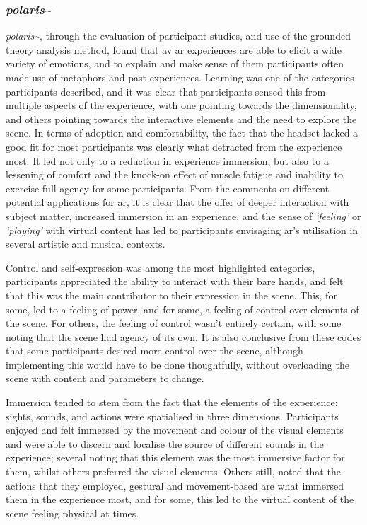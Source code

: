 \subsubsection{\textit{polaris\textasciitilde{}}}
\textit{polaris\textasciitilde{}}, through the evaluation of participant studies, and use of the grounded theory analysis method, found that \gls{av} \gls{ar} experiences are able to elicit a wide variety of emotions, and to explain and make sense of them participants often made use of metaphors and past experiences. Learning was one of the categories participants described, and it was clear that participants sensed this from multiple aspects of the experience, with one pointing towards the dimensionality, and others pointing towards the interactive elements and the need to explore the scene. In terms of adoption and comfortability, the fact that the headset lacked a good fit for most participants was clearly what detracted from the experience most. It led not only to a reduction in experience immersion, but also to a lessening of comfort and the knock-on effect of muscle fatigue and inability to exercise full agency for some participants. From the comments on different potential applications for \gls{ar}, it is clear that the offer of deeper interaction with subject matter, increased immersion in an experience, and the sense of \textit{`feeling'} or \textit{`playing'} with virtual content has led to participants envisaging \gls{ar}'s utilisation in several artistic and musical contexts. 

Control and self-expression was among the most highlighted categories, participants appreciated the ability to interact with their bare hands, and felt that this was the main contributor to their expression in the scene. This, for some, led to a feeling of power, and for some, a feeling of control over elements of the scene. For others, the feeling of control wasn't entirely certain, with some noting that the scene had agency of its own. It is also conclusive from these codes that some participants desired more control over the scene, although implementing this would have to be done thoughtfully, without overloading the scene with content and parameters to change.

Immersion tended to stem from the fact that the elements of the experience: sights, sounds, and actions were spatialised in three dimensions. Participants enjoyed and felt immersed by the movement and colour of the visual elements and were able to discern and localise the source of different sounds in the experience; several noting that this element was the most immersive factor for them, whilst others preferred the visual elements. Others still, noted that the actions that they employed, gestural and movement-based are what immersed them in the experience most, and for some, this led to the virtual content of the scene feeling physical at times.

